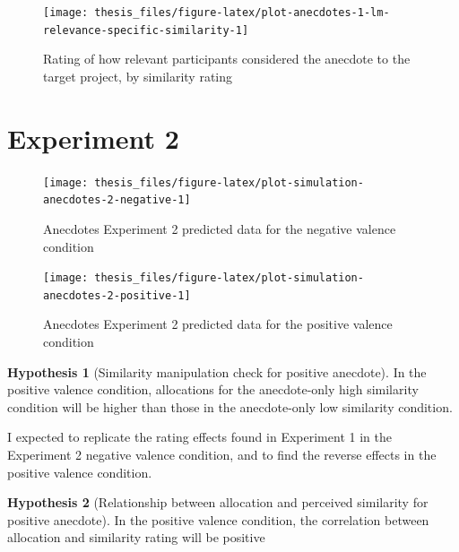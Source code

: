 \documentclass[a4paper, nobind, dvipsnames]{templates/ociamthesis}
\theoremstyle{definition}
\theoremstyle{definition}
\theoremstyle{definition}
\theoremstyle{definition}
\newtheorem{hypothesis}{Hypothesis}[chapter]
\theoremstyle{remark}
\begin{document}
\begin{figure}
\texttt{[image: thesis\_files/figure-latex/plot-anecdotes-1-lm-relevance-specific-similarity-1]} \caption{Rating of how relevant participants considered the anecdote to the target project, by similarity rating}\label{fig:plot-anecdotes-1-lm-relevance-specific-similarity}
\end{figure}

\hypertarget{anecdotes-2-appendix}{%
\section{Experiment 2}\label{anecdotes-2-appendix}}



\begin{figure}
\texttt{[image: thesis\_files/figure-latex/plot-simulation-anecdotes-2-negative-1]} \caption{Anecdotes Experiment 2 predicted data for the negative valence condition}\label{fig:plot-simulation-anecdotes-2-negative}
\end{figure}



\begin{figure}
\texttt{[image: thesis\_files/figure-latex/plot-simulation-anecdotes-2-positive-1]} \caption{Anecdotes Experiment 2 predicted data for the positive valence condition}\label{fig:plot-simulation-anecdotes-2-positive}
\end{figure}

\begin{hypothesis}[Similarity manipulation check for positive anecdote]
\protect\hypertarget{hyp:similarity-check-anecdotes-2}{}{\label{hyp:similarity-check-anecdotes-2} {} }In the positive valence condition, allocations for the anecdote-only high
similarity condition will be higher than those in the anecdote-only low
similarity condition.
\end{hypothesis}

I expected to replicate the rating effects found in Experiment 1 in the
Experiment 2 negative valence condition, and to find the reverse effects in the
positive valence condition.

\begin{hypothesis}[Relationship between allocation and perceived similarity for positive anecdote]
\protect\hypertarget{hyp:allocation-similarity-anecdotes-2}{}{\label{hyp:allocation-similarity-anecdotes-2} {} }In the positive valence condition, the correlation between allocation and
similarity rating will be positive
\end{hypothesis}
\end{document}
